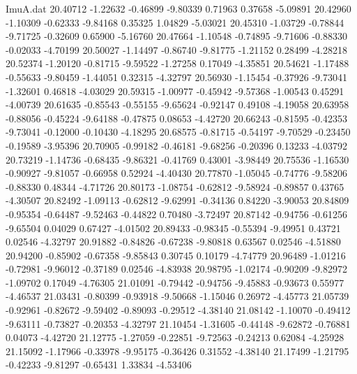 \begin{filecontents}{ImuA.dat}
  20.40712   -1.22632   -0.46899   -9.80339    0.71963    0.37658   -5.09891
  20.42960   -1.10309   -0.62333   -9.84168    0.35325    1.04829   -5.03021
  20.45310   -1.03729   -0.78844   -9.71725   -0.32609    0.65900   -5.16760
  20.47664   -1.10548   -0.74895   -9.71606   -0.88330   -0.02033   -4.70199
  20.50027   -1.14497   -0.86740   -9.81775   -1.21152    0.28499   -4.28218
  20.52374   -1.20120   -0.81715   -9.59522   -1.27258    0.17049   -4.35851
  20.54621   -1.17488   -0.55633   -9.80459   -1.44051    0.32315   -4.32797
  20.56930   -1.15454   -0.37926   -9.73041   -1.32601    0.46818   -4.03029
  20.59315   -1.00977   -0.45942   -9.57368   -1.00543    0.45291   -4.00739
  20.61635   -0.85543   -0.55155   -9.65624   -0.92147    0.49108   -4.19058
  20.63958   -0.88056   -0.45224   -9.64188   -0.47875    0.08653   -4.42720
  20.66243   -0.81595   -0.42353   -9.73041   -0.12000   -0.10430   -4.18295
  20.68575   -0.81715   -0.54197   -9.70529   -0.23450   -0.19589   -3.95396
  20.70905   -0.99182   -0.46181   -9.68256   -0.20396    0.13233   -4.03792
  20.73219   -1.14736   -0.68435   -9.86321   -0.41769    0.43001   -3.98449
  20.75536   -1.16530   -0.90927   -9.81057   -0.66958    0.52924   -4.40430
  20.77870   -1.05045   -0.74776   -9.58206   -0.88330    0.48344   -4.71726
  20.80173   -1.08754   -0.62812   -9.58924   -0.89857    0.43765   -4.30507
  20.82492   -1.09113   -0.62812   -9.62991   -0.34136    0.84220   -3.90053
  20.84809   -0.95354   -0.64487   -9.52463   -0.44822    0.70480   -3.72497
  20.87142   -0.94756   -0.61256   -9.65504    0.04029    0.67427   -4.01502
  20.89433   -0.98345   -0.55394   -9.49951    0.43721    0.02546   -4.32797
  20.91882   -0.84826   -0.67238   -9.80818    0.63567    0.02546   -4.51880
  20.94200   -0.85902   -0.67358   -9.85843    0.30745    0.10179   -4.74779
  20.96489   -1.01216   -0.72981   -9.96012   -0.37189    0.02546   -4.83938
  20.98795   -1.02174   -0.90209   -9.82972   -1.09702    0.17049   -4.76305
  21.01091   -0.79442   -0.94756   -9.45883   -0.93673    0.55977   -4.46537
  21.03431   -0.80399   -0.93918   -9.50668   -1.15046    0.26972   -4.45773
  21.05739   -0.92961   -0.82672   -9.59402   -0.89093   -0.29512   -4.38140
  21.08142   -1.10070   -0.49412   -9.63111   -0.73827   -0.20353   -4.32797
  21.10454   -1.31605   -0.44148   -9.62872   -0.76881    0.04073   -4.42720
  21.12775   -1.27059   -0.22851   -9.72563   -0.24213    0.62084   -4.25928
  21.15092   -1.17966   -0.33978   -9.95175   -0.36426    0.31552   -4.38140
  21.17499   -1.21795   -0.42233   -9.81297   -0.65431    1.33834   -4.53406

\end{filecontents}

